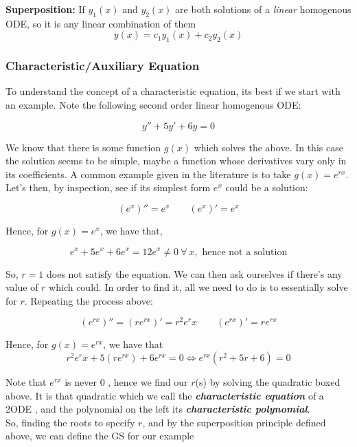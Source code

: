 \documentclass[english,course]{Notes}
\newcommand{\ita}[1]{\textit{#1}}
\begin{document}


\begin{theorem}{\textbf{Superposition: }}{If $y_1(x)$ and $y_2(x)$ are both solutions of a \ita{linear} homogenous ODE, so it is any linear combination of them $$y(x) = c_1y_1(x) + c_2y_2(x)$$}\end{theorem}

\subsubsection{Characteristic/Auxiliary Equation}

\par{To understand the concept of a characteristic equation, its best if we start with an example. Note the following second order linear homogenous ODE:}

$$y'' + 5y' + 6y = 0$$

\par{We know that there is some function $g(x)$ which solves the above. In this case the solution seems to be simple, maybe a function whose derivatives vary only in its coefficients. A common example given in the literature is to take $g(x) = e^{rx}$. Let's then, by inspection,  see if its simplest form $e^x$ could be a solution:}

$$ (e^x)'' = e^x \quad \quad (e^x)' = e^x $$

\par{Hence, for $g(x) = e^x$, we have that,}

$$e^x + 5e^x + 6e^x = 12e^x \neq 0 \ \forall \  x , \text{ hence not a solution}$$

\par{So, $r=1$ does not satisfy the equation. We can then ask ourselves if there's any value of $r$ which could. In order to find it, all we need to do is to essentially solve for $r$. Repeating the process above:}

$$(e^{rx})'' = (re^{rx})' = r^2e^rx \quad \quad (e^{rx})' = re^{rx}$$

\par{Hence, for $g(x) = e^{rx}$, we have that}
$$r^2e^rx + 5(re^{rx}) + 6e^{rx} = 0 \iff e^{rx} \boxed{(r^2 + 5r + 6)} = 0$$

\par{Note that $e^{rx}$ is never $0$ , hence we find our $r$(s) by solving the quadratic boxed above. It is that quadratic which we call the \textbf{\ita{characteristic equation}} of a 2ODE , and the polynomial on the left its \textbf{\ita{characteristic polynomial}}.\\
So, finding the roots to specify $r$, and by the superposition principle defined above, we can define the GS for our example}
\end{document}
